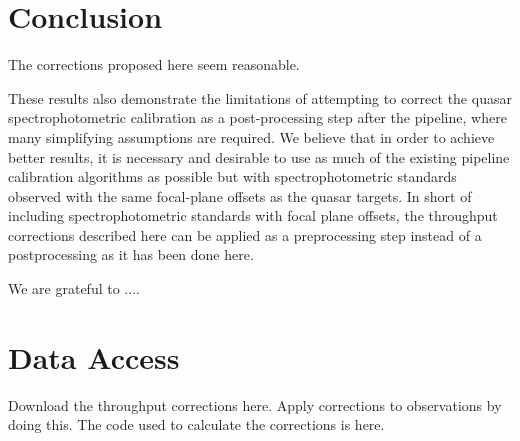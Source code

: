 \documentclass{emulateapj}
\begin{document}
\section{Conclusion}

The corrections proposed here seem reasonable.

These results also demonstrate the limitations of attempting to correct the quasar spectrophotometric calibration as a post-processing step after the pipeline, where many simplifying assumptions are required. We believe that in order to achieve better results, it is necessary and desirable to use as much of the existing pipeline calibration algorithms as possible but with spectrophotometric standards observed with the same focal-plane offsets as the quasar targets. In short of including spectrophotometric standards with focal plane offsets, the throughput corrections described here can be applied as a preprocessing step instead of a postprocessing as it has been done here.

\acknowledgments

We are grateful to ....

\appendix

\section{Data Access}

Download the throughput corrections here. Apply corrections to observations by doing this. The code used to calculate the corrections is here.


\end{document}
